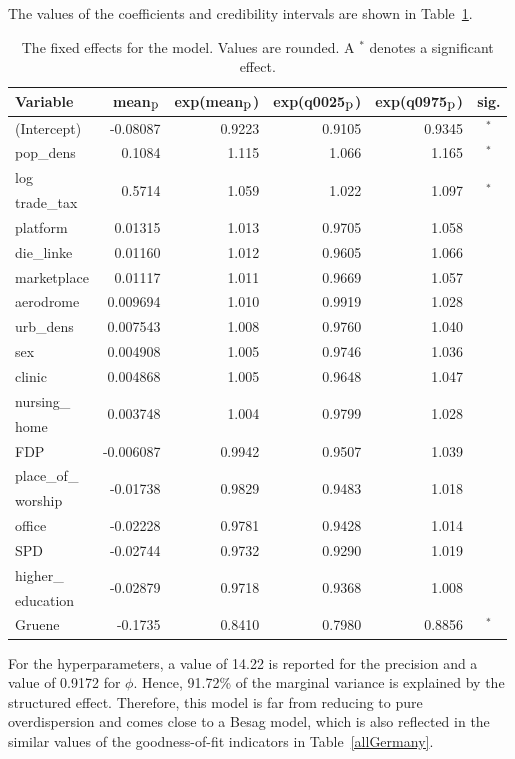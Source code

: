 The values of the coefficients and credibility intervals are shown in Table~\ref{FixedAllGermany_spatial}.
\begin{table}[H]
\caption{The fixed effects for the model. Values are rounded. A $^*$ denotes a significant effect. \label{FixedAllGermany_spatial}}
\begin{tabular}{l r r r r c}
\toprule
\textbf{Variable}	& \textbf{mean$_{\hbox{p}}$}	& \textbf{exp(mean$_{\hbox{p}}$)} & \textbf{exp(q0025$_{\hbox{p}}$)} & \textbf{exp(q0975$_{\hbox{p}}$)} & \textbf{sig.}\\
\midrule
(Intercept) & -0.08087 & 0.9223 & 0.9105 & 0.9345 & $^*$\\
pop\_dens & 0.1084 & 1.115 & 1.066 & 1.165 & $^*$\\
log & \multirow{2}{*}{0.5714} & \multirow{2}{*}{1.059} & \multirow{2}{*}{1.022} & \multirow{2}{*}{1.097} & \multirow{2}{*}{$^*$}\\
trade\_tax \\
platform & 0.01315 & 1.013 & 0.9705 & 1.058 \\
die\_linke & 0.01160 & 1.012 & 0.9605 & 1.066 \\
marketplace & 0.01117 & 1.011 & 0.9669 & 1.057 \\
aerodrome & 0.009694 & 1.010 & 0.9919 & 1.028 \\
urb\_dens & 0.007543 & 1.008 & 0.9760 & 1.040 \\
sex & 0.004908 & 1.005 & 0.9746 & 1.036 \\
clinic & 0.004868 & 1.005 & 0.9648 & 1.047 \\
nursing\_ & \multirow{2}{*}{0.003748} & \multirow{2}{*}{1.004} & \multirow{2}{*}{0.9799} & \multirow{2}{*}{1.028} \\
home\\
FDP & -0.006087 & 0.9942 & 0.9507 & 1.039 \\
place\_of\_ & \multirow{2}{*}{-0.01738} & \multirow{2}{*}{0.9829} & \multirow{2}{*}{0.9483} & \multirow{2}{*}{1.018} \\
worship\\
office & -0.02228 & 0.9781 & 0.9428 & 1.014 \\
SPD & -0.02744 & 0.9732 & 0.9290 & 1.019 \\
higher\_ & \multirow{2}{*}{-0.02879} & \multirow{2}{*}{0.9718} & \multirow{2}{*}{0.9368} & \multirow{2}{*}{1.008} \\
education\\
Gruene & -0.1735 & 0.8410 & 0.7980 & 0.8856 & $^*$\\
\bottomrule
\end{tabular}
\end{table}
For the hyperparameters, a value of 14.22 is reported for the precision and a value of 0.9172 for $\phi$. Hence, 91.72\% of the marginal variance is explained by the structured effect. Therefore, this model is far from reducing to pure overdispersion and comes close to a Besag model, which is also reflected in the similar values of the goodness-of-fit indicators in Table~\ref{allGermany}.
